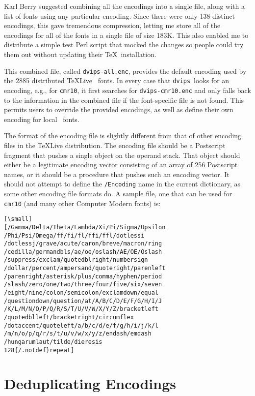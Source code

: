 \documentclass{ltugboat}
\def\dvips{\texttt{dvips}}
\begin{document}
Karl Berry suggested combining all the encodings into a single
file, along with a list of fonts using any particular encoding.
Since there were only 138 distinct encodings, this gave
tremendous compression, letting me store all of the encodings
for all of the fonts in a single file of size 183K.  This also
enabled me to distribute a simple test Perl script that mocked
the changes so people could try them out without updating their
\TeX\ installation.

This combined file, called \texttt{dvips-all.enc}, provides
the default encoding used by the 2885 distributed \TeX Live
\MF\ fonts.  In every case that \dvips\ looks for an encoding,
e.g., for \texttt{cmr10}, it first searches for \texttt{dvips-cmr10.enc}
and only falls back to the information in the combined file if
the font-specific file is not found.  This permits users to override
the provided encodings, as well as define their
own encoding for local \MF\ fonts.

The format of the encoding file is slightly different from that
of other encoding files in the \TeX Live distribution.  The
encoding file should be a Postscript fragment that pushes a
single object on the operand stack.  That object should either be a
legitimate encoding vector consisting of an array of 256
Postscript names, or it should be a procedure that pushes
such an encoding vector.  It should not attempt to define
the \texttt{/Encoding} name in the current dictionary, as some other
encoding file formats do.  A sample file, one that can be used
for \texttt{cmr10} (and many other Computer Modern fonts) is:

\begin{verbatim}[\small]
[/Gamma/Delta/Theta/Lambda/Xi/Pi/Sigma/Upsilon
/Phi/Psi/Omega/ff/fi/fl/ffi/ffl/dotlessi
/dotlessj/grave/acute/caron/breve/macron/ring
/cedilla/germandbls/ae/oe/oslash/AE/OE/Oslash
/suppress/exclam/quotedblright/numbersign
/dollar/percent/ampersand/quoteright/parenleft
/parenright/asterisk/plus/comma/hyphen/period
/slash/zero/one/two/three/four/five/six/seven
/eight/nine/colon/semicolon/exclamdown/equal
/questiondown/question/at/A/B/C/D/E/F/G/H/I/J
/K/L/M/N/O/P/Q/R/S/T/U/V/W/X/Y/Z/bracketleft
/quotedblleft/bracketright/circumflex
/dotaccent/quoteleft/a/b/c/d/e/f/g/h/i/j/k/l
/m/n/o/p/q/r/s/t/u/v/w/x/y/z/endash/emdash
/hungarumlaut/tilde/dieresis
128{/.notdef}repeat]
\end{verbatim}

\section{Deduplicating Encodings}
\end{document}
